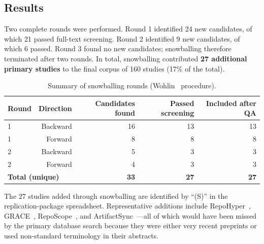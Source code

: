 \subsection*{Results}

Two complete rounds were performed.  Round 1 identified 24 new candidates, of which
21 passed full-text screening.  Round 2 identified 9 new candidates, of which 6 passed.
Round 3 found no new candidates; snowballing therefore terminated after two rounds.
In total, snowballing contributed \textbf{27 additional primary studies} to the final
corpus of 160 studies (17\% of the total).

\begin{table}[h]
\caption{Summary of snowballing rounds (Wohlin~\cite{wohlin2014snowballing} procedure).}
\label{tab:snowballing-rounds}
\small
\begin{tabular}{lrrrr}
\toprule
\textbf{Round} & \textbf{Direction} & \textbf{Candidates found} & \textbf{Passed screening} & \textbf{Included after QA} \\
\midrule
1 & Backward  & 16 & 13 & 13 \\
1 & Forward   &  8 &  8 &  8 \\
2 & Backward  &  5 &  3 &  3 \\
2 & Forward   &  4 &  3 &  3 \\
\midrule
\multicolumn{2}{l}{\textbf{Total (unique)}} & \textbf{33} & \textbf{27} & \textbf{27} \\
\bottomrule
\end{tabular}
\end{table}

\noindent The 27 studies added through snowballing are identified by ``(S)'' in the
replication-package spreadsheet.  Representative additions include
RepoHyper~\cite{phan2025repohyper}, GRACE~\cite{wang2025grace},
RepoScope~\cite{liu2025reposcope}, and
ArtifactSync~\cite{alor2026artifactsync}---all of which would have been missed by the
primary database search because they were either very recent preprints or used
non-standard terminology in their abstracts.
